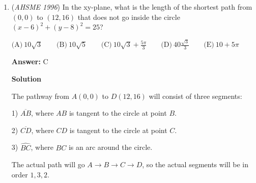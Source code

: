 \begin{enumerate}
 Subtracting the area of the two triangles from the area of the equilateral triangle, we find that the area of the kite is $\sqrt{3} - \frac{\sqrt{3}}{4} = \frac{3\sqrt{3}}{4}$.

 Thus, the ratio of areas is $\frac{3}{4}$, which is option $\boxed{D}$.

 



\textbf{Solution 2}

We see six isosceles $120-30-30$ triangles at the vertices of the large hexagon.  If we let the side of the larger hexagon be $1$, we find that the two congruent sides of these triangles are both $\frac{1}{2}$.  By the \href{https://artofproblemsolving.com/wiki/index.php?title=Law\_of\_Sines}{Law of Sines}, we find that the third side $x$ is:

 $\frac{\frac{1}{2}}{\sin 30^\circ} = \frac{x}{\sin 120^\circ}$
$1 = \frac{x}{\frac{\sqrt{3}}{2}}$
$x = \frac{\sqrt{3}}{2}$

 This third side of the triangle is the length of the edge of the hexagon.  The ratio of the sides of the small hexagon to the large hexagon is $\frac{\sqrt{3}}{2}$, since the large hexagon has a unit side.  The ratio of the areas is the square of the ratio of the sides, which is $\frac{3}{4}$, or option $\boxed{D}$.

 


	\item (\textit{AHSME 1996}) In the xy-plane, what is the length of the shortest path from $(0,0)$ to $(12,16)$ that does not go inside the circle $(x-6)^{2}+(y-8)^{2}= 25$?


 $\text{(A)}\ 10\sqrt 3\qquad\text{(B)}\ 10\sqrt 5\qquad\text{(C)}\ 10\sqrt 3+\frac{ 5\pi}{3}\qquad\text{(D)}\ 40\frac{\sqrt{3}}{3}\qquad\text{(E)}\ 10+5\pi$

 \textbf{Answer: }C



\textbf{Solution}

The pathway from $A(0,0)$ to $D(12,16)$ will consist of three segments:

 1)  $\overline{AB}$, where $AB$ is tangent to the circle at point $B$.

 2)  $\overline{CD}$, where $CD$ is tangent to the circle at point $C$.

 3)  $\widehat {BC}$, where $BC$ is an arc around the circle.

 The actual path will go $A \rightarrow B \rightarrow C \rightarrow D$, so the actual segments will be in order $1, 3, 2$.


\end{enumerate}
